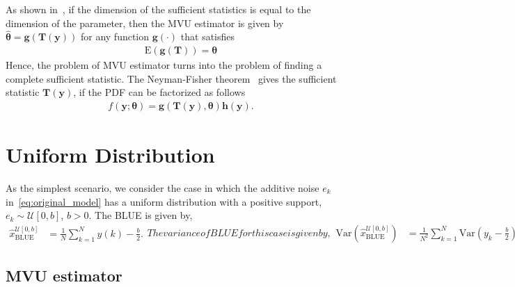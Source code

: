 \documentclass[journal]{IEEEtran}
\newcommand{\E}{\mathrm{E}}
\newcommand{\Var}{\mathrm{Var}}
\begin{document}
As shown in~\cite{book:ET_kay_93}, if the dimension of the sufficient statistics is equal to the dimension of the parameter, then the MVU estimator is given by $\hat{\bm{\theta}}=\bm{g}(\bm{T}(\bm{y}))$ for any function $\bm{g}(\cdot)$ that satisfies
%
%
\begin{align}
\E(\bm{g}(\bm{T})) = \bm{\theta}
\end{align}
%
%
Hence, the problem of MVU estimator turns into the problem of finding a complete sufficient statistic. The Neyman-Fisher theorem~\cite{article:fisher_22,article:AMS_halmos_49} gives the sufficient statistic $\bm{T}(\bm{y})$, if the PDF can be factorized as follows
%
%
\begin{align}
f(\bm{y};\bm{\theta}) = \bm{g}(\bm{T}(\bm{y}),\bm{\theta})\bm{h}(\bm{y}).
\end{align}
%
%
\section{Uniform Distribution}\label{sec:uniform_distribution}
As the simplest scenario, we consider the case in which the additive noise $e_k$ in~\eqref{eq:original_model} has a uniform distribution with a positive support,$e_k\sim\mathcal{U}[0,b]$, $b>0$. The BLUE is given by,
%
%
\begin{subequations}
	\begin{align}
	\hat{x}_{\mathrm{BLUE}}^{\mathcal{U}[0,b]} &= \frac{1}{N}\sum_{k=1}^N y(k) - \frac{b}{2}.
	\label{eq:sample_mean_example}
	\end{align}
	The variance of BLUE for this case is given by,
	\begin{align}
	\Var(\hat{x}_{\mathrm{BLUE}}^{\mathcal{U}[0,b]}) &= \frac{1}{N^2}\sum_{k=1}^{N}\Var\left(y_k-\frac{b}{2}\right)= \frac{b^2}{12N}.
	\end{align}
\end{subequations}
\subsection{MVU estimator}\label{subsec:mvu_estimator}
\end{document}
